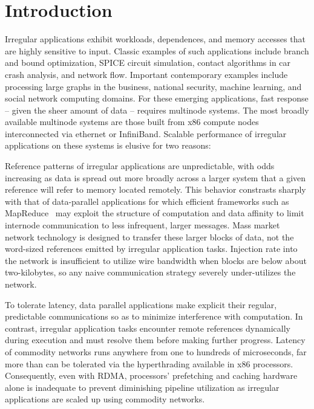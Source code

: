 \section{Introduction} \label{sec:intro}

Irregular applications exhibit workloads, dependences, and memory accesses
that are highly sensitive to input. Classic examples of such applications
include branch and bound optimization, SPICE circuit simulation, contact
algorithms in car crash analysis, and network flow. Important contemporary
examples include processing large graphs in the business, national security,
machine learning, and social network computing domains. For these emerging
applications, fast response -- given the sheer amount of data -- requires
multinode systems. The most broadly available multinode systems are those
built from x86 compute nodes interconnected via ethernet or InfiniBand.
Scalable performance of irregular applications on these systems is elusive
for two reasons:

 Reference patterns of irregular
applications are unpredictable, with odds increasing as data is
spread out more broadly across a larger system that a given reference
will refer to memory located remotely.  This behavior constrasts
sharply with that of data-parallel applications for which efficient
frameworks such as MapReduce~\cite{mapreduce:osdi04} may exploit the
structure of computation and data affinity to limit internode
communication to less infrequent, larger messages.  Mass
market network technology is designed to transfer these larger blocks
of data, not the word-sized references emitted by irregular
application tasks. Injection rate into the network is insufficient to
utilize wire bandwidth when blocks are below about two-kilobytes, so
any naive communication strategy severely under-utilizes the network.

 To tolerate latency, data parallel applications make explicit
their regular, predictable communications so as to minimize interference with computation.
In contrast, irregular application tasks encounter remote references dynamically during
execution and must resolve them before making further progress.  Latency of
commodity networks runs anywhere from one to hundreds of microseconds,
far more than can be tolerated via the hyperthrading available in x86 processors.
Consequently, even with RDMA, processors' prefetching and caching hardware alone is inadequate
to prevent diminishing pipeline utilization as irregular applications are scaled up using
commodity networks.

